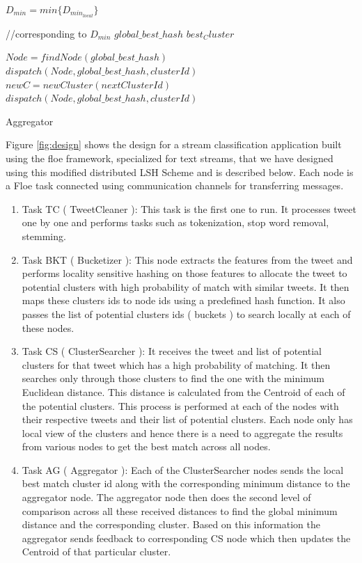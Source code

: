 \documentclass{article} %
\begin{document}
\begin{algorithm}
\SetAlgoLined 
{}

	$D_{min} = min\lbrace D_{min_{local}} \rbrace$\;
	
	//corresponding to $D_{min}$\;
	$global\_best\_hash$\;
	$best_Cluster$\;

	$Node = findNode(global\_best\_hash)$\;
	{
		$dispatch(Node, global\_best\_hash, clusterId)$\;
	}
	{
		$newC = newCluster(nextClusterId)$\;
		$dispatch(Node, global\_best\_hash, clusterId)$\;
	}
	
\label{algo:dlsh3}
\caption{Aggregator}
\end{algorithm}



Figure \ref{fig:design} shows the design for a stream classification application built using the floe framework, specialized for text streams, that we have designed using this modified distributed LSH Scheme and is described below. Each node is a Floe task connected using communication channels for transferring messages. 

\begin{enumerate}
\item Task TC ( TweetCleaner ): This task is the first one to run. It processes tweet one by one and performs tasks such as tokenization, stop word removal, stemming.
\item Task BKT ( Bucketizer ): This node extracts the features from the tweet and performs locality sensitive hashing on those features to allocate the tweet to potential clusters with high probability of match with similar tweets. It then maps these clusters ids to node ids using a predefined hash function. It also passes the list of potential clusters ids ( buckets ) to search locally at each of these nodes.
\item Task CS ( ClusterSearcher ): It receives the tweet and list of potential clusters for that tweet which has a high probability of matching. It then searches only through those clusters to find the one with the minimum Euclidean distance. This distance is calculated from the Centroid of each of the potential clusters. This process is performed at each of the nodes with their respective tweets and their list of potential clusters. Each node only has local view of the clusters and hence there is a need to aggregate the results from various nodes to get the best match across all nodes.
\item Task AG ( Aggregator ): Each of the ClusterSearcher nodes sends the local best match cluster id along with the corresponding minimum distance to the aggregator node. The aggregator node then does the second level of comparison across all these received distances to find the global minimum distance and the corresponding cluster. Based on this information the aggregator sends feedback to corresponding CS node which then updates the Centroid of that particular cluster.
\end{enumerate}
\end{document}
